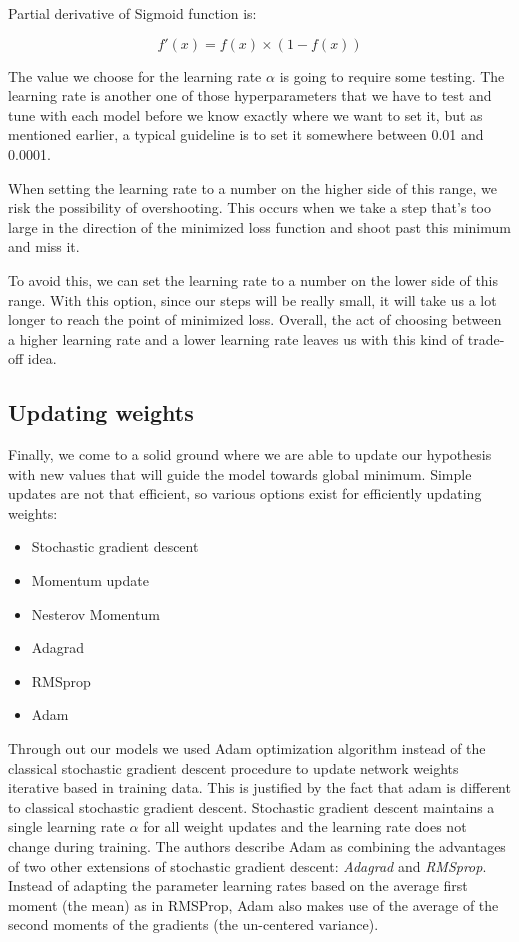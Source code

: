 Partial derivative of Sigmoid function is:

\begin{equation} \label{eq:backward_prop_4}
    f'(x)= f(x) \times (1 - f(x)) 
\end{equation}

The value we choose for the learning rate $\alpha$ is going to require some testing. The learning rate is another one of those hyperparameters that we have to test and tune with each model before we know exactly where we want to set it, but as mentioned earlier, a typical guideline is to set it somewhere between 0.01 and 0.0001.

When setting the learning rate to a number on the higher side of this range, we risk the possibility of overshooting. This occurs when we take a step that's too large in the direction of the minimized loss function and shoot past this minimum and miss it.

To avoid this, we can set the learning rate to a number on the lower side of this range. With this option, since our steps will be really small, it will take us a lot longer to reach the point of minimized loss.
Overall, the act of choosing between a higher learning rate and a lower learning rate leaves us with this kind of trade-off idea.

\subsection{Updating weights} \label{updating_weights}
Finally, we come to a solid ground where we are able to update our hypothesis with new values that will guide the model towards global minimum. Simple updates are not that efficient, so various options exist for efficiently updating weights:

\begin{itemize}
    \item Stochastic gradient descent
    \item Momentum update
    \item Nesterov Momentum
    \item Adagrad
    \item RMSprop
    \item Adam
\end{itemize}

Through out our models we used Adam \cite{adam} optimization algorithm instead of the classical stochastic gradient descent procedure to update network weights iterative based in training data. This is justified by the fact that adam is different to classical stochastic gradient descent. Stochastic gradient descent maintains a single learning rate $\alpha$ for all weight updates and the learning rate does not change during training. The authors describe Adam as combining the advantages of two other extensions of stochastic gradient descent: \textit{Adagrad} and \textit{RMSprop}. Instead of adapting the parameter learning rates based on the average first moment (the mean) as in RMSProp, Adam also makes use of the average of the second moments of the gradients (the un-centered variance).

